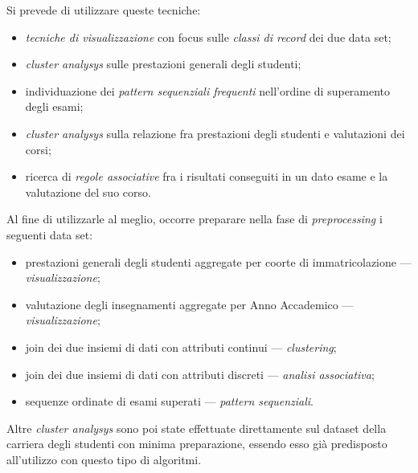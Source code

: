         Si prevede di utilizzare queste tecniche:

        \begin{itemize}
            \item \textit{tecniche di visualizzazione} con focus sulle \textit{classi di record} dei due data set;
            \item \textit{cluster analysys} sulle prestazioni generali degli studenti;
            \item individuazione dei \textit{pattern sequenziali frequenti} nell'ordine di superamento degli esami;
            \item \textit{cluster analysys} sulla relazione fra prestazioni degli studenti e valutazioni dei corsi;
            \item ricerca di \textit{regole associative} fra i risultati conseguiti in un dato esame e la valutazione del suo corso.
        \end{itemize}

        Al fine di utilizzarle al meglio, occorre preparare nella fase di \textit{preprocessing} i seguenti data set:

        \begin{itemize}
            \item prestazioni generali degli studenti aggregate per coorte di immatricolazione --- \textit{visualizzazione};
            \item valutazione degli insegnamenti aggregate per Anno Accademico --- \textit{visualizzazione};
            \item join dei due insiemi di dati con attributi continui --- \textit{clustering};
            \item join dei due insiemi di dati con attributi discreti --- \textit{analisi associativa};
            \item sequenze ordinate di esami superati --- \textit{pattern sequenziali}.
        \end{itemize}

        Altre \textit{cluster analysys} sono poi state effettuate direttamente sul dataset della carriera degli studenti con minima preparazione, essendo esso già predisposto all'utilizzo con questo tipo di algoritmi.
